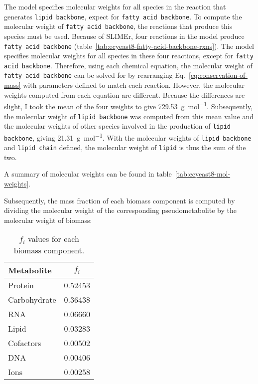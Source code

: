 The model specifies molecular weights for all species in the reaction that generates \texttt{lipid backbone}, expect for \texttt{fatty acid backbone}.
To compute the molecular weight of \texttt{fatty acid backbone}, the reactions that produce this species must be used.
Because of SLIMEr, four reactions in the model produce \texttt{fatty acid backbone} (table~\ref{tab:ecyeast8-fatty-acid-backbone-rxns}).
The model specifies molecular weights for all species in these four reactions, except for \texttt{fatty acid backbone}.
Therefore, using each chemical equation, the molecular weight of \texttt{fatty acid backbone} can be solved for by rearranging Eq.\ \ref{eq:conservation-of-mass} with parameters defined to match each reaction.
However, the molecular weights computed from each equation are different.%
Because the differences are slight, %
I took the mean of the four weights to give \SI{729.53}{\gram~\mole^{-1}}.
Subsequently, the molecular weight of \texttt{lipid backbone} was computed from this mean value and the molecular weights of other species involved in the production of \texttt{lipid backbone}, giving \SI{21.31}{\gram~\mole^{-1}}.
With the molecular weights of \texttt{lipid backbone} and \texttt{lipid chain} defined, the molecular weight of \texttt{lipid} is thus the sum of the two.

A summary of molecular weights can be found in table~\ref{tab:ecyeast8-mol-weights}.

Subsequently, the mass fraction of each biomass component is computed by dividing the molecular weight of the corresponding pseudometabolite by the molecular weight of biomass:

\begin{table}[ht]
  \centering
  \begin{tabular}{lS}
    Metabolite & {$f_{i}$} \\
    \hline
    Protein & 0.52453 \\
    Carbohydrate & 0.36438 \\
    RNA & 0.06660 \\
    Lipid & 0.03283 \\
    Cofactors & 0.00502 \\
    DNA & 0.00406 \\
    Ions & 0.00258 \\
  \end{tabular}
  \caption{
    $f_{i}$ values for each biomass component.
  }
  \label{tab:model-biomfrac}
\end{table}


